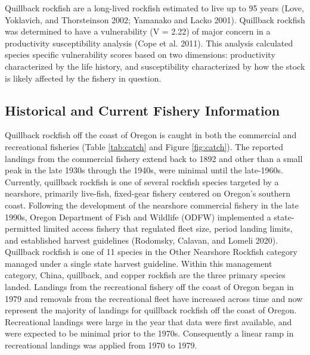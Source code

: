 \documentclass[11pt,
  english,
  a4paper,
]{article}
\begin{document}
\leavevmode\tagmcend\tagstructend\par


Quillback rockfish are a long-lived rockfish estimated to live up to 95 years {(Love, Yoklavich, and Thorsteinson 2002; Yamanako and Lacko 2001)\leavevmode\tagmcend\tagstructend}. Quillback rockfish was determined to have a vulnerability (V = 2.22) of major concern in a productivity susceptibility analysis {(Cope et al. 2011)\leavevmode\tagmcend\tagstructend}. This analysis calculated species specific vulnerability scores based on two dimensions: productivity characterized by the life history, and susceptibility characterized by how the stock is likely affected by the fishery in question.

\leavevmode\tagmcend\tagstructend\par


\hypertarget{historical-and-current-fishery-information}{%
\subsection{Historical and Current Fishery Information}\label{historical-and-current-fishery-information}}

\leavevmode\tagmcend\tagstructend


Quillback rockfish off the coast of Oregon is caught in both the commercial and recreational fisheries (Table \ref{tab:catch} and Figure \ref{fig:catch}). The reported landings from the commercial fishery extend back to 1892 and other than a small peak in the late 1930s through the 1940s, were minimal until the late-1960s. Currently, quillback rockfish is one of several rockfish species targeted by a nearshore, primarily live-fish, fixed-gear fishery centered on Oregon's southern coast. Following the development of the nearshore commercial fishery in the late 1990s, Oregon Department of Fish and Wildlife (ODFW) implemented a state-permitted limited access fishery that regulated fleet size, period landing limits, and established harvest guidelines {(Rodomsky, Calavan, and Lomeli 2020)\leavevmode\tagmcend\tagstructend}. Quillback rockfish is one of 11 species in the Other Nearshore Rockfish category managed under a single state harvest guideline. Within this management category, China, quillback, and copper rockfish are the three primary species landed. Landings from the recreational fishery off the coast of Oregon began in 1979 and removals from the recreational fleet have increased across time and now represent the majority of landings for quillback rockfish off the coast of Oregon. Recreational landings were large in the year that data were first available, and were expected to be minimal prior to the 1970s. Consequently a linear ramp in recreational landings was applied from 1970 to 1979.
\end{document}
